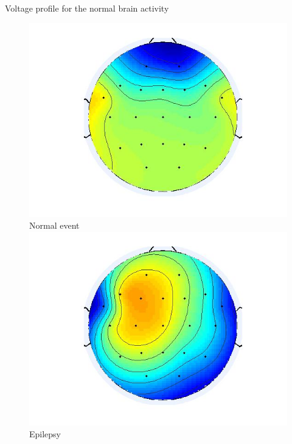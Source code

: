 \documentclass[t,12pt,english
\ifx\beamermode\undefined\else,\beamermode\fi
]{beamer}
\begin{document}
\begin{frame}{Voltage profile for the normal brain activity }

\begin{figure}[!htbp]
%
\centering
\includegraphics[width=1\textwidth]{20.jpg}\\
\tiny{Normal event}\label{a20}
\endminipage\hfill
{}%
\centering
\includegraphics[width=1\textwidth]{21.jpg}\\
\tiny{Epilepsy}\label{a21}
\endminipage\hfill
{}%
\centering

\end{figure}
\end{frame}
\end{document}
